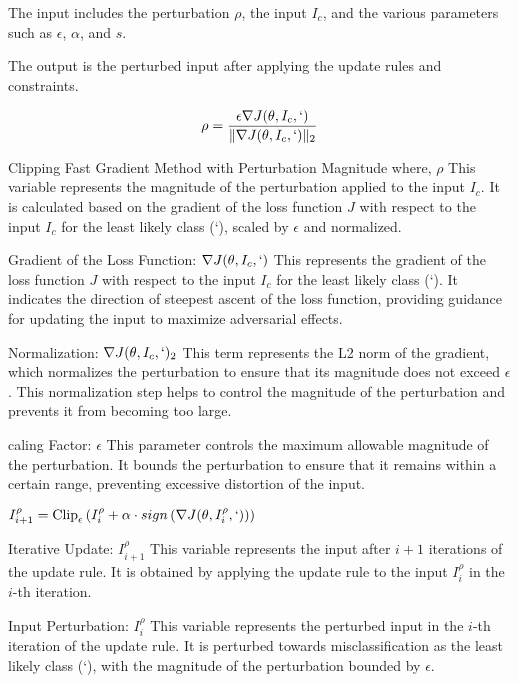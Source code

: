 The input includes the perturbation $\rho$, the input $I_c$, and the various parameters such as $\epsilon$, $\alpha$, and $s$.

The output is the perturbed input after applying the update rules and constraints.

\begin{equation*}
    \rho = \frac{\epsilon \nabla J(\theta, I_c, `)}{\| \nabla J(\theta, I_c, `) \|_2}
\end{equation*}

Clipping Fast Gradient Method with Perturbation Magnitude where,
$\rho$ This variable represents the magnitude of the perturbation applied to the input $I_c$. It is calculated based on the gradient of the loss function $J$ with respect to the input $I_c$ for the least likely class (`), scaled by $\epsilon$ and normalized.

Gradient of the Loss Function:
$\nabla J(\theta, I_c, `)$
This represents the gradient of the loss function $J$ with respect to the input $I_c$ for the least likely class (`). It indicates the direction of steepest ascent of the loss function, providing guidance for updating the input to maximize adversarial effects.

Normalization:
$\nabla J(\theta, I_c, `) _2$
This term represents the L2 norm of the gradient, which normalizes the perturbation to ensure that its magnitude does not exceed $\epsilon$. This normalization step helps to control the magnitude of the perturbation and prevents it from becoming too large.

caling Factor:
$\epsilon$
This parameter controls the maximum allowable magnitude of the perturbation. It bounds the perturbation to ensure that it remains within a certain range, preventing excessive distortion of the input.

$I_{i+1}^\rho = \text{Clip}_\epsilon \left( I_i^\rho + \alpha \cdot sign \left( \nabla J(\theta, I_i^\rho, `) \right) \right)$

Iterative Update:
$I_{i+1}^\rho$
This variable represents the input after $i+1$ iterations of the update rule. It is obtained by applying the update rule to the input $I_i^\rho$ in the $i$-th iteration.

Input Perturbation:
$I_i^\rho$
This variable represents the perturbed input in the $i$-th iteration of the update rule. It is perturbed towards misclassification as the least likely class (`), with the magnitude of the perturbation bounded by $\epsilon$.

